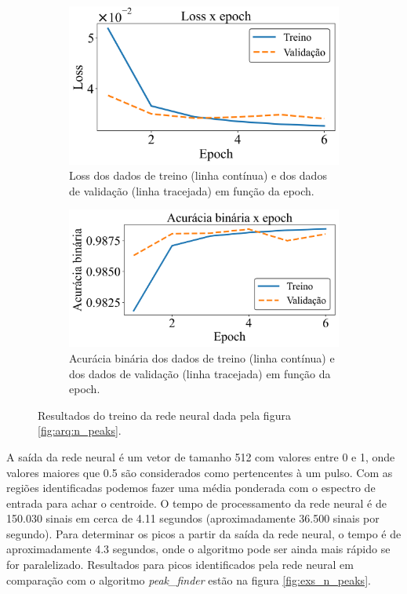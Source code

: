 \documentclass[a4paper,12pt,oneside]{book}
\begin{document}
\begin{figure}[H]
\centering
    \begin{subfigure}[t]{0.49\textwidth}
        \centering
        \includegraphics[scale=0.42]{figs/n_peaks_loss.png}
        \caption{Loss dos dados de treino (linha contínua) e dos dados de validação (linha tracejada) em função da epoch.}
        \label{subfig:n_peaks_loss}
    \end{subfigure}%
    \hfill
    \begin{subfigure}[t]{0.46\textwidth}
        \centering
        \includegraphics[scale=0.42]{figs/n_peaks_metric.png}
        \caption{Acurácia binária dos dados de treino (linha contínua) e dos dados de validação (linha tracejada) em função da epoch.}
        \label{subfig:n_peaks_metric}
    \end{subfigure}
\caption{Resultados do treino da rede neural dada pela figura \ref{fig:arq:n_peaks}.}
\label{fig:n_peaks_results}
\end{figure}

\par A saída da rede neural é um vetor de tamanho 512 com valores entre 0 e 1, onde valores maiores que 0.5 são considerados como pertencentes à um pulso. Com as regiões identificadas podemos fazer uma média ponderada com o espectro de entrada para achar o centroide. O tempo de processamento da rede neural é de 150.030 sinais em cerca de 4.11 segundos (aproximadamente 36.500 sinais por segundo). Para determinar os picos a partir da saída da rede neural, o tempo é de aproximadamente 4.3 segundos, onde o algoritmo pode ser ainda mais rápido se for paralelizado. Resultados para picos identificados pela rede neural em comparação com o algoritmo \textit{peak\_finder} estão na figura \ref{fig:exs_n_peaks}.
\end{document}
